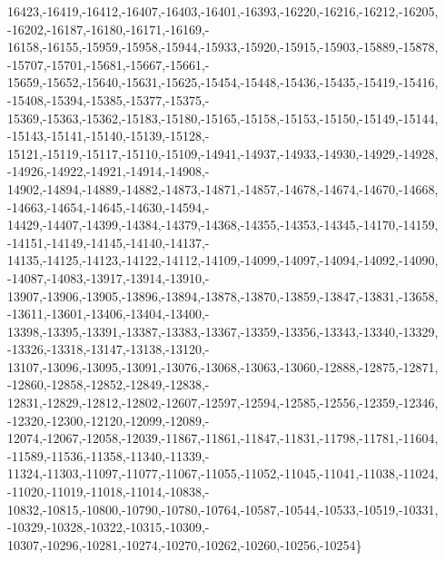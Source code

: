 \begin{DoxyCode}
      16423,-16419,-16412,-16407,-16403,-16401,-16393,-16220,-16216,-16212,-16205,
                                                                    -16202,-16187,-16180,-16171,-16169,-
      16158,-16155,-15959,-15958,-15944,-15933,-15920,-15915,-15903,-15889,-15878,
                                                                    -15707,-15701,-15681,-15667,-15661,-
      15659,-15652,-15640,-15631,-15625,-15454,-15448,-15436,-15435,-15419,-15416,
                                                                    -15408,-15394,-15385,-15377,-15375,-
      15369,-15363,-15362,-15183,-15180,-15165,-15158,-15153,-15150,-15149,-15144,
                                                                    -15143,-15141,-15140,-15139,-15128,-
      15121,-15119,-15117,-15110,-15109,-14941,-14937,-14933,-14930,-14929,-14928,
                                                                    -14926,-14922,-14921,-14914,-14908,-
      14902,-14894,-14889,-14882,-14873,-14871,-14857,-14678,-14674,-14670,-14668,
                                                                    -14663,-14654,-14645,-14630,-14594,-
      14429,-14407,-14399,-14384,-14379,-14368,-14355,-14353,-14345,-14170,-14159,
                                                                    -14151,-14149,-14145,-14140,-14137,-
      14135,-14125,-14123,-14122,-14112,-14109,-14099,-14097,-14094,-14092,-14090,
                                                                    -14087,-14083,-13917,-13914,-13910,-
      13907,-13906,-13905,-13896,-13894,-13878,-13870,-13859,-13847,-13831,-13658,
                                                                    -13611,-13601,-13406,-13404,-13400,-
      13398,-13395,-13391,-13387,-13383,-13367,-13359,-13356,-13343,-13340,-13329,
                                                                    -13326,-13318,-13147,-13138,-13120,-
      13107,-13096,-13095,-13091,-13076,-13068,-13063,-13060,-12888,-12875,-12871,
                                                                    -12860,-12858,-12852,-12849,-12838,-
      12831,-12829,-12812,-12802,-12607,-12597,-12594,-12585,-12556,-12359,-12346,
                                                                    -12320,-12300,-12120,-12099,-12089,-
      12074,-12067,-12058,-12039,-11867,-11861,-11847,-11831,-11798,-11781,-11604,
                                                                    -11589,-11536,-11358,-11340,-11339,-
      11324,-11303,-11097,-11077,-11067,-11055,-11052,-11045,-11041,-11038,-11024,
                                                                    -11020,-11019,-11018,-11014,-10838,-
      10832,-10815,-10800,-10790,-10780,-10764,-10587,-10544,-10533,-10519,-10331,
                                                                    -10329,-10328,-10322,-10315,-10309,-
      10307,-10296,-10281,-10274,-10270,-10262,-10260,-10256,-10254\}
\end{DoxyCode}


